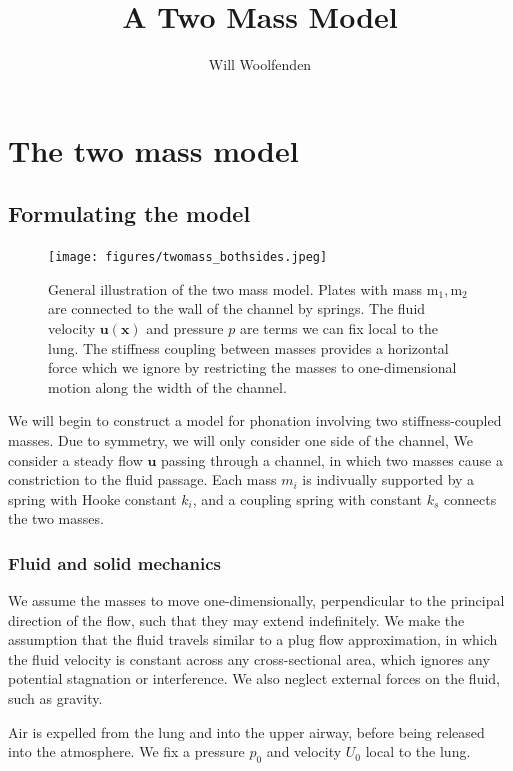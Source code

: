 \documentclass{report}
\begin{document}
\title{A Two Mass Model}
\author{Will Woolfenden}

\chapter{The two mass model}

\section{Formulating the model}

\begin{figure}[h]
    \centering
    \texttt{[image: figures/twomass\_bothsides.jpeg]}
    \caption{General illustration of the two mass model. Plates with mass $\mathrm{m_1},\mathrm{m_2}$ are connected to the wall of the channel by springs.
    The fluid velocity $\bm{u(x)}$ and pressure $p$ are terms we can fix local to the lung.
    The stiffness coupling between masses provides a horizontal force which we ignore by restricting the masses to one-dimensional motion along the width of the channel.}
    \label{fig:twomass_bothsides}
\end{figure}

We will begin to construct a model for phonation involving two stiffness-coupled masses.
Due to symmetry, we will only consider one side of the channel, 
We consider a steady flow $\mathbf{u}$ passing through a channel,
in which two masses cause a constriction to the fluid passage.
Each mass $m_i$ is indivually supported by a spring with Hooke constant $k_i$,
and a coupling spring with constant $k_s$ connects the two masses.

\subsection{Fluid and solid mechanics}

We assume the masses to move one-dimensionally, perpendicular to the principal direction of the flow,
such that they may extend indefinitely.
We make the assumption that the fluid travels similar to a plug flow approximation,
in which the fluid velocity is constant across any cross-sectional area, %
which ignores any potential stagnation or interference.
We also neglect external forces on the fluid, such as gravity.

Air is expelled from the lung and into the upper airway, before being released into the atmosphere.
We fix a pressure $p_0$ and velocity $U_0$ local to the lung.
\end{document}
